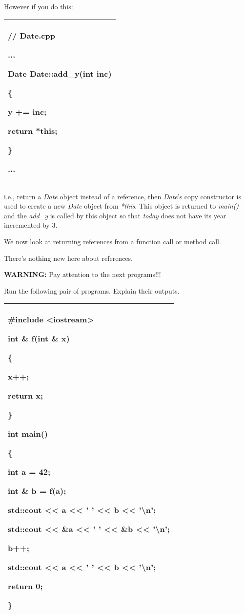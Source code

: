 \documentclass[
]{article}
\begin{document}
However if you do this:

\begin{longtable}[]{@{}l@{}}
\toprule
\endhead
\begin{minipage}[t]{0.97\columnwidth}\raggedright
// Date.cpp

...

\textbf{Date }Date::add\_y(int inc)

\{

y += inc;

\textbf{return *this;}

\}

...\strut
\end{minipage}\tabularnewline
\bottomrule
\end{longtable}

i.e., return a \emph{Date} object instead of a reference, then
\emph{Date}'s copy constructor is used to create a new \emph{Date}
object from \emph{*this}. This object is returned to \emph{main()} and
the \emph{add\_y} is called by this object so that \emph{today} does not
have its year incremented by 3.

We now look at returning references from a function call or method call.

There's nothing new here about references.

\textbf{WARNING: }Pay attention to the next programs!!!

Run the following pair of programs. Explain their outputs.

\begin{longtable}[]{@{}l@{}}
\toprule
\endhead
\begin{minipage}[t]{0.97\columnwidth}\raggedright
\#include \textless iostream\textgreater{}

int \& f(int \& x)

\{

x++;

return x;

\}

int main()

\{

int a = 42;

int \& b = f(a);

std::cout \textless\textless{} a \textless\textless{} ' '
\textless\textless{} b \textless\textless{} '\textbackslash n';

std::cout \textless\textless{} \&a \textless\textless{} ' '
\textless\textless{} \&b \textless\textless{} '\textbackslash n';

b++;

std::cout \textless\textless{} a \textless\textless{} ' '
\textless\textless{} b \textless\textless{} '\textbackslash n';

return 0;

\}\strut
\end{minipage}\tabularnewline
\bottomrule
\end{longtable}
\end{document}
